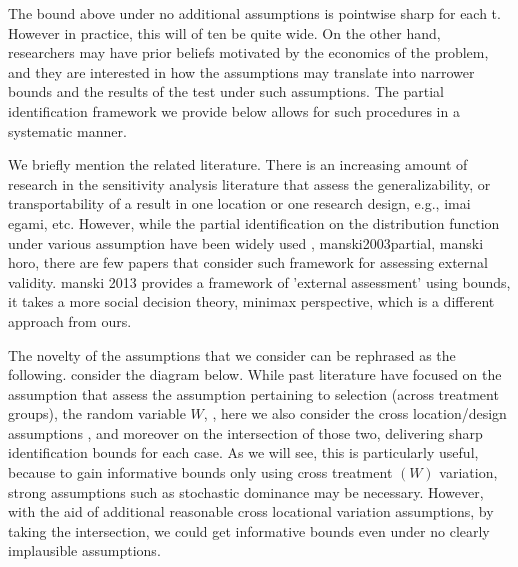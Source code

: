 \documentclass[uplatex,dvipdfmx]{jsarticle}
\begin{document}
The bound above under no additional assumptions is pointwise sharp for each t. However in practice, this will of ten be quite wide. On the other hand, researchers may have prior beliefs motivated by the economics of the problem, and they are interested in how the assumptions may translate into narrower bounds and the results of the test under such assumptions. The partial identification framework we provide below allows for such procedures in a systematic manner.

We briefly mention the related literature.
There is an increasing amount of research in the sensitivity analysis literature that assess the generalizability, or transportability of a result in one location or one research design, e.g., %
{imai egami, } etc. However, while the partial identification on the distribution function under various assumption have been widely used \cite{blundell2007changes}, manski2003partial, manski horo, there are few papers that consider such framework for assessing external validity. %
{manski 2013} provides a framework of 'external assessment' using bounds, it takes a more social decision theory, minimax perspective, which is a different approach from ours. 

The novelty of the assumptions that we consider can be rephrased as the following. consider the diagram below. While past literature have focused on the assumption that assess the assumption pertaining to selection (across treatment groups), the random variable $W$, \cite{blundell2007changes}, here we also consider the cross location/design assumptions , and moreover on the intersection of those two, delivering sharp identification bounds for each case. As we will see, this is particularly useful, because to gain informative bounds only using cross treatment $(W)$ variation, strong assumptions such as stochastic dominance may be necessary. However, with the aid of additional reasonable cross locational variation assumptions, by taking the intersection, we could get informative bounds even under no clearly implausible assumptions. 
\end{document}
